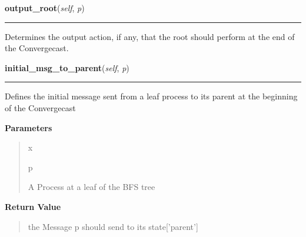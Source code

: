     \label{datk:core:algs:AsynchConvergecast:output_root}

    \vspace{0.5ex}

\hspace{.8\funcindent}\begin{boxedminipage}{\funcwidth}

    \raggedright \textbf{output\_root}(\textit{self}, \textit{p})

    \vspace{-1.5ex}

    \rule{\textwidth}{0.5\fboxrule}
\setlength{\parskip}{2ex}
    Determines the output action, if any, that the root should perform at 
    the end of the Convergecast.

\setlength{\parskip}{1ex}
    \end{boxedminipage}

    \label{datk:core:algs:AsynchConvergecast:initial_msg_to_parent}

    \vspace{0.5ex}

\hspace{.8\funcindent}\begin{boxedminipage}{\funcwidth}

    \raggedright \textbf{initial\_msg\_to\_parent}(\textit{self}, \textit{p})

    \vspace{-1.5ex}

    \rule{\textwidth}{0.5\fboxrule}
\setlength{\parskip}{2ex}
    Defines the initial message sent from a leaf process to its parent at 
    the beginning of the Convergecast

\setlength{\parskip}{1ex}
      \textbf{Parameters}
      \vspace{-1ex}

      \begin{quote}
        \begin{Ventry}{x}

          \item[p]

          A Process at a leaf of the BFS tree

        \end{Ventry}

      \end{quote}

      \textbf{Return Value}
    \vspace{-1ex}

      \begin{quote}
      the Message p should send to its state['parent']

      \end{quote}

    \end{boxedminipage}

